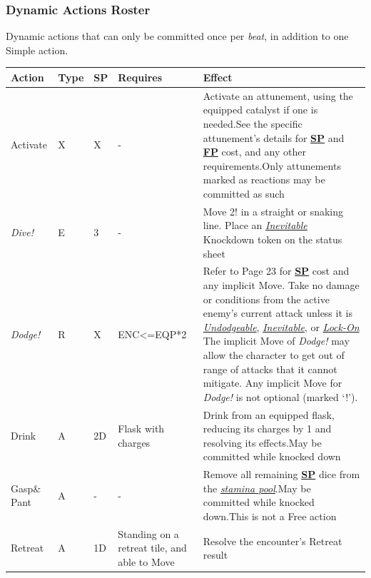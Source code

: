 \documentclass[12pt]{article}
\newcommand{\refto}[1]{\hyperlink{#1}{\textbf{#1}}}
\newcommand{\reftoit}[1]{\hyperlink{#1}{\emph{#1}}}
\begin{document}
\subsubsection{Dynamic Actions Roster}
Dynamic actions that can only be committed once per \emph{beat}, in addition to one Simple action.\\
\begin{center}
\begin{tabularx}{\textwidth}{p{}p{}p{}p{}p{}}
\hline
\rowcolor{white} \textbf{Action} & \textbf{Type} & \textbf{SP} & \textbf{Requires} & \textbf{Effect}\setcounter{rownum}{0}\\
\hline
Activate & X & X & - & Activate an attunement, using the equipped catalyst if one is needed.\newline See the specific attunement’s details for \refto{SP} and \refto{FP} cost, and any other requirements.\newline Only attunements marked as reactions may be committed as such\\
\emph{Dive!} & E & 3 & - & Move 2! in a straight or snaking line.\newline
Place an \reftoit{Inevitable} Knockdown token on the status sheet\\
\emph{Dodge!} & R & X & ENC<=EQP*2 & Refer to Page 23 for \refto{SP} cost and any implicit Move.\newline
Take no damage or conditions from the active enemy’s current attack unless it is \reftoit{Undodgeable}, \reftoit{Inevitable}, or \reftoit{Lock-On}\newline
The implicit Move of \emph{Dodge!} may allow the character to get out of range of attacks that it cannot mitigate. Any implicit Move for \emph{Dodge!} is not optional (marked ‘!’).\\
Drink & A & 2D & Flask with charges & Drink from an equipped flask, reducing its charges by 1 and resolving its effects.\newline May be committed while knocked down\\
Gasp\newline \& Pant & A & - & - & Remove all remaining \refto{SP} dice from the \reftoit{stamina pool}.\newline May be committed while knocked down.\newline This is not a Free action\\
Retreat & A & 1D & Standing on a retreat tile, and able to Move & Resolve the encounter’s Retreat result\\

\end{tabularx}
\end{center}
\end{document}
